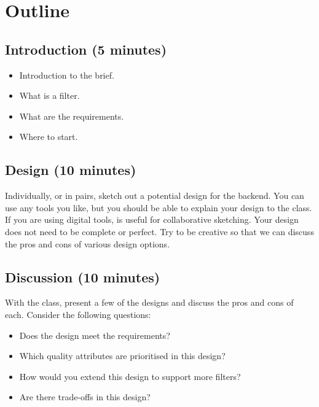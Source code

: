 \documentclass{csse4400}
\begin{document}
\section{Outline}

\subsection*{Introduction (5 minutes)}
\begin{itemize}[topsep=5pt,partopsep=2pt,itemsep=2pt,parsep=2pt]
    \item Introduction to the brief.
    \item What is a filter.
    \item What are the requirements.
    \item Where to start.
\end{itemize}


\subsection*{Design (10 minutes)}
Individually, or in pairs, sketch out a potential design for the backend.
You can use any tools you like, but you should be able to explain your design to the class.
If you are using digital tools,  is useful for collaborative sketching.
Your design does not need to be complete or perfect.
Try to be creative so that we can discuss the pros and cons of various design options.

\subsection*{Discussion (10 minutes)}
With the class, present a few of the designs and discuss the pros and cons of each.
Consider the following questions:
\begin{itemize}
    \item Does the design meet the requirements?
    \item Which quality attributes are prioritised in this design?
    \item How would you extend this design to support more filters?
    \item Are there trade-offs in this design?
\end{itemize}
\end{document}
